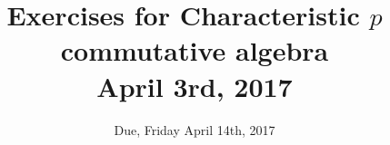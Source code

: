 \documentclass[12pt]{amsart}
\numberwithin{equation}{theorem}
\renewcommand{\:}{\colon}
\theoremstyle{theorem}
\begin{document}
\title{Exercises for Characteristic $p$ commutative algebra\\April 3rd, 2017}
\author{Due, Friday April 14th, 2017}



\maketitle

%
%
\end{document}
